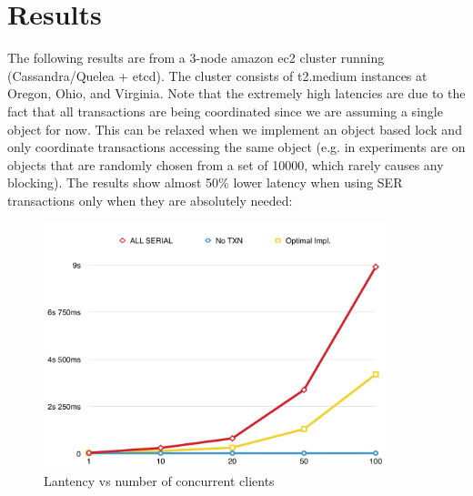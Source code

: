 \documentclass[12pt,letter]{article}
\begin{document}
\section{Results}
The following results are from a 3-node amazon ec2 cluster running (Cassandra/Quelea + etcd). The cluster consists of t2.medium instances at Oregon, Ohio, and Virginia. 
Note that the extremely high latencies are due to the fact that 
all transactions are being coordinated since we are assuming a 
single object for now. This can be relaxed when we implement an object 
based lock and only coordinate transactions accessing the same object 
(e.g. in \cite{quelea} experiments are on objects that are randomly 
chosen from a set of 10000, which rarely causes any blocking).
The results show almost 50\% lower latency when using SER transactions only when they are absolutely needed:
\begin{figure}[h]
  \begin{center}
  \includegraphics[width=0.9\textwidth]{figures/results.png}
  \end{center}
  \caption {Lantency vs number of concurrent clients}
\end{figure}

    
\end{document}
